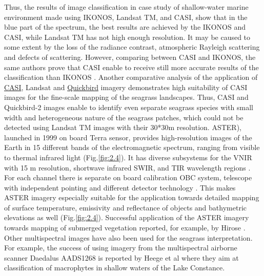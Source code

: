 \documentclass[11pt]{article}
\begin{document}
Thus, the results of image classification in case study of shallow-water marine environment \cite{Mumby02}\label{Mumby02}
made using IKONOS, \ac{Landsat TM}, and \ac{CASI}, show that in the blue part of the
spectrum, the best results are achieved by the IKONOS and \ac{CASI}, while \ac{Landsat TM} has not high
enough resolution. 
It may be caused to some extent by the loss of the radiance contrast, atmospheric
Rayleigh scattering and defects of scattering. However, comparing between CASI and IKONOS, the
same authors prove that \ac{CASI} enable to receive still more accurate results of the classification
than IKONOS \cite{Mumby02}\label{Mumby02}.
Another comparative analysis of the application of \href{http://www.itres.com/products/imagers/casi550}{CASI}, Landsat and \href{http://www.digitalglobe.com/index.php/85/QuickBird}{Quickbird} imagery \cite{Phinn08}\label{Phinn08}
 demonstrates high suitability of \ac{CASI} images for the fine-scale mapping of the seagrass
landscapes. Thus, \ac{CASI} and Quickbird-2 images enable to identify even separate seagrass species
with small width and heterogeneous nature of the seagrass patches, which could not be detected using
Landsat TM images with their 30*30m resolution.
\ac{ASTER}), launched in
1999 on board Terra sensor, provides high-resolution images of the Earth in 15 different bands of the
electromagnetic spectrum, ranging from visible to thermal infrared light  (Fig.\ref{fig:2.4}). It has diverse
subsystems for the \ac{VNIR} with 15 m resolution, shortwave infrared \ac{SWIR}, and
\ac{TIR} wavelength regions \cite{Kalinowski04}\label{Kalinowski04}. For each channel there is separate
on board calibration \ac{OBC} system, telescope with independent pointing and different detector technology \cite{Arai05}\label{Arai05}. 
This makes \ac{ASTER}\label{page-19} imagery especially suitable for the application towards detailed
mapping of surface temperature, emissivity and reflectance of objects and bathymetric elevations as
well (Fig.\ref{fig:2.4}). Successful application of the \ac{ASTER} imagery towards mapping of submerged vegetation
reported, for example, by Hirose \cite{Hirose04}\label{Hirose04}. 
Other multispectral images have also been used for the
seagrass interpretation. For example, the success of using imagery from the multispectral airborne
scanner Daedalus AADS1268 is reported by Heege et al \cite{Heege03}\label{Heege03} where they aim at classification of
macrophytes in shallow waters of the Lake Constance. 
\end{document}
